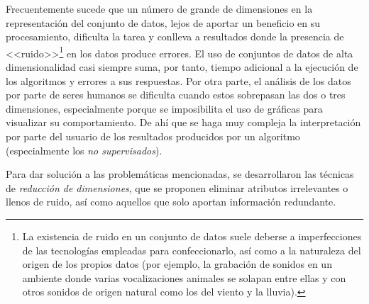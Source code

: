 Frecuentemente sucede que un número de grande de dimensiones en la representación del conjunto de datos, lejos de aportar un beneficio en su procesamiento, dificulta la tarea y conlleva a resultados donde la presencia de <<ruido>>\footnote{La existencia de ruido en un conjunto de datos suele deberse a imperfecciones de las tecnologías empleadas para confeccionarlo, así como a la naturaleza del origen de los propios datos (por ejemplo, la grabación de sonidos en un ambiente donde varias vocalizaciones animales se solapan entre ellas y con otros sonidos de origen natural como los del viento y la lluvia).} en los datos produce errores.
El uso de conjuntos de datos de alta dimensionalidad casi siempre suma, por tanto, tiempo adicional a la ejecución de los algoritmos y errores a sus respuestas.
Por otra parte, el análisis de los datos por parte de seres humanos se dificulta cuando estos sobrepasan las dos o tres dimensiones, especialmente porque se imposibilita el uso de gráficas para visualizar su comportamiento.
De ahí que se haga muy compleja la interpretación por parte del usuario de los resultados producidos por un algoritmo (especialmente los \textit{no supervisados}).

Para dar solución a las problemáticas mencionadas, se desarrollaron las técnicas de \textit{reducción de dimensiones}, que se proponen eliminar atributos irrelevantes o llenos de ruido, así como aquellos que solo aportan información redundante.

%

%